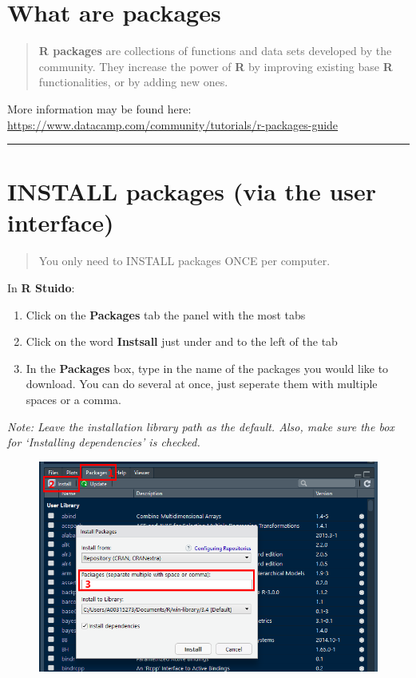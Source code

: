 \documentclass[]{book}
\providecommand{\tightlist}{%
  \setlength{\itemsep}{0pt}\setlength{\parskip}{0pt}}
\theoremstyle{definition}
\theoremstyle{definition}
\theoremstyle{definition}
\theoremstyle{remark}
\begin{document}
\section{What are packages}\label{what-are-packages}

\begin{quote}
\textbf{R packages} are collections of functions and data sets developed
by the community. They increase the power of \textbf{R} by improving
existing base \textbf{R} functionalities, or by adding new ones.
\end{quote}

More information may be found here:
\url{https://www.datacamp.com/community/tutorials/r-packages-guide}

\begin{center}\rule{0.5\linewidth}{\linethickness}\end{center}

\section{INSTALL packages (via the user
interface)}\label{install-packages-via-the-user-interface}

\begin{quote}
You only need to INSTALL packages ONCE per computer.
\end{quote}

In \textbf{R Stuido}:

\begin{enumerate}
\def\labelenumi{\arabic{enumi}.}
\tightlist
\item
  Click on the \textbf{Packages} tab the panel with the most tabs
\item
  Click on the word \textbf{Instsall} just under and to the left of the
  tab
\item
  In the \textbf{Packages} box, type in the name of the packages you
  would like to download. You can do several at once, just seperate them
  with multiple spaces or a comma.
\end{enumerate}

\emph{Note: Leave the installation library path as the default. Also,
make sure the box for `Installing dependencies' is checked.}

\begin{figure}
\centering
\includegraphics{img/Install_Package_Screenshot.png}
\caption{}
\end{figure}
\end{document}
